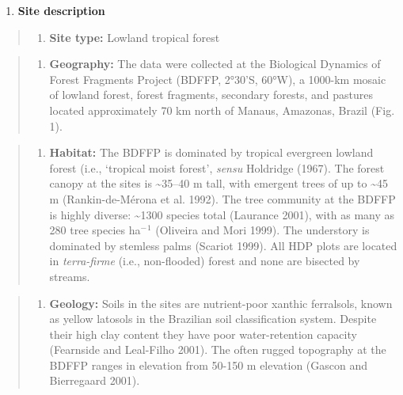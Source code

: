 \documentclass[
  12pt,
  man, donotrepeattitle]{apa6}
\providecommand{\tightlist}{%
  \setlength{\itemsep}{0pt}\setlength{\parskip}{0pt}}
\begin{document}
\begin{enumerate}
\def\labelenumi{\arabic{enumi}.}
\tightlist
\item
  \textbf{Site description}
\end{enumerate}

\begin{quote}
\begin{enumerate}
\def\labelenumi{\alph{enumi}.}
\tightlist
\item
  \textbf{Site type:} Lowland tropical forest
\end{enumerate}
\end{quote}

\begin{quote}
\begin{enumerate}
\def\labelenumi{\alph{enumi}.}
\setcounter{enumi}{1}
\tightlist
\item
  \textbf{Geography:} The data were collected at the Biological Dynamics of Forest Fragments Project (BDFFP, 2°30'S, 60°W), a 1000-km mosaic of lowland forest, forest fragments, secondary forests, and pastures located approximately 70 km north of Manaus, Amazonas, Brazil (Fig. 1).
\end{enumerate}
\end{quote}

\begin{quote}
\begin{enumerate}
\def\labelenumi{\alph{enumi}.}
\setcounter{enumi}{2}
\tightlist
\item
  \textbf{Habitat:} The BDFFP is dominated by tropical evergreen lowland forest (i.e., `tropical moist forest', \emph{sensu} Holdridge (1967). The forest canopy at the sites is \textasciitilde35--40 m tall, with emergent trees of up to \textasciitilde45 m (Rankin-de-Mérona et al. 1992). The tree community at the BDFFP is highly diverse: \textasciitilde1300 species total (Laurance 2001), with as many as 280 tree species ha\(^-\)\(^1\) (Oliveira and Mori 1999). The understory is dominated by stemless palms (Scariot 1999). All HDP plots are located in \emph{terra-firme} (i.e., non-flooded) forest and none are bisected by streams.
\end{enumerate}
\end{quote}

\begin{quote}
\begin{enumerate}
\def\labelenumi{\alph{enumi}.}
\setcounter{enumi}{3}
\tightlist
\item
  \textbf{Geology:} Soils in the sites are nutrient-poor xanthic ferralsols, known as yellow latosols in the Brazilian soil classification system. Despite their high clay content they have poor water-retention capacity (Fearnside and Leal-Filho 2001). The often rugged topography at the BDFFP ranges in elevation from 50-150 m elevation (Gascon and Bierregaard 2001).
\end{enumerate}
\end{quote}
\end{document}
